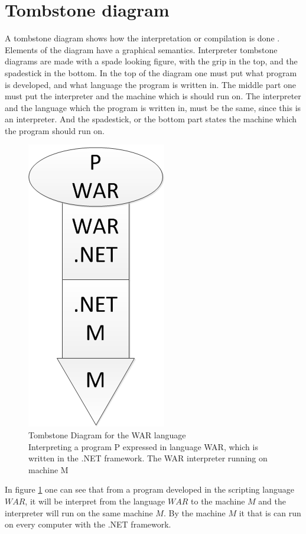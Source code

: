 \section{Tombstone diagram}

A tombstone diagram shows how the interpretation or compilation is done \cite{Tombstone}.
Elements of the diagram have a graphical semantics. 
Interpreter tombstone diagrams are made with a spade looking figure, with the grip in the top, and the spadestick in the bottom. In the top of the diagram one must put what program is developed, and what language the program is written in. The middle part one must put the interpreter and the machine which is should run on. The interpreter and the language which the program is written in, must be the same, since this is an interpreter. And the spadestick, or the bottom part states the machine which the program should run on.

			\begin{figure}
				\centering
				\includegraphics[scale=0.75]{rapport/3/figures/tombstone}
				\caption{Tombstone Diagram for the WAR language\\ Interpreting a program P expressed in language WAR, which is written in the .NET framework. The WAR interpreter running on machine M} \label{fig:tombstone}
			\end{figure}
			
In figure \ref{fig:tombstone} one can see that from a program developed in the scripting language $WAR$, it will be interpret from the language $WAR$ to the machine $M$ and the interpreter will run on the same machine $M$. By the machine $M$ it that is can run on every computer with the .NET framework.

